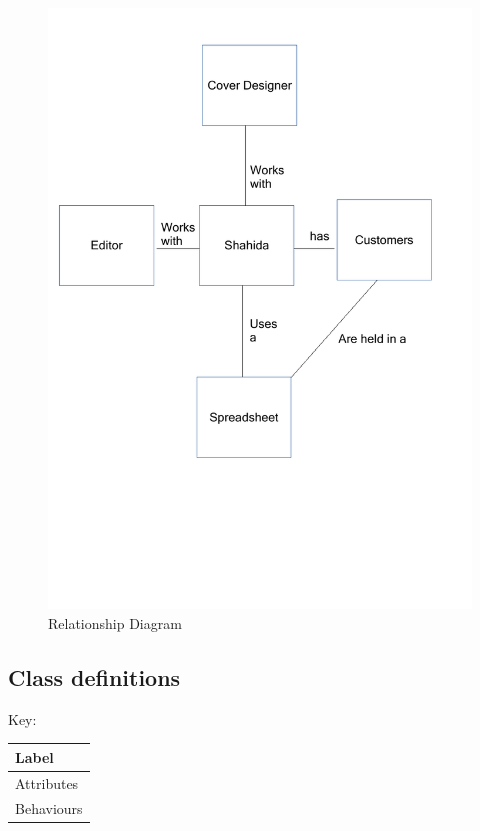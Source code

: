 \begin{figure}[H]
    \includegraphics[width=\textwidth]{./Analysis/Relationship_Diagram.pdf}
    \caption{Relationship Diagram} \label{Relationship_Diagram.pdf}
\end{figure}

\subsection{Class definitions}

Key:

\begin{tabular}{|p{2.5cm}|}
    \hline
    \textbf{Label}  \\ \hline
    Attributes \\ \hline
    Behaviours  \\ \hline
    \hline
\end{tabular}

